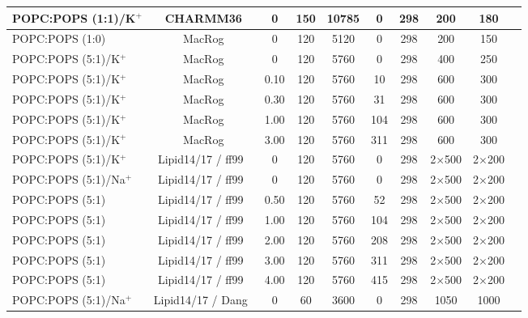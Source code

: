 \documentclass[aps,prl,superscriptaddress,twocolumn]{revtex4}
\begin{document}
\begin{table*}[tb]
\begin{tabular}{lccccccccc}
POPC:POPS (1:1)/K$^{+}$  & CHARMM36 \cite{klauda10,venable13}  & 0  & 150  & 10785  & 0  & 298  & 200  & 180  & \cite{POPC1POPS1noCaClCHARMM} \tabularnewline
\hline 
POPC:POPS (1:0)  & MacRog \cite{maciejewski14}  & 0  & 120 & 5120  & 0  & 298  & 200  & 150  & \cite{macrogPOPC298K} \tabularnewline
POPC:POPS (5:1)/K$^{+}$  & MacRog \cite{maciejewski14}  & 0  & 120 & 5760  & 0  & 298  & 400 & 250 &  \cite{POPCpopsMACROG}\tabularnewline
POPC:POPS (5:1)/K$^{+}$  & MacRog \cite{maciejewski14}  & 0.10  & 120  & 5760  & 10  & 298  & 600  & 300  & \cite{POPCpopsMACROG} \tabularnewline
POPC:POPS (5:1)/K$^{+}$  & MacRog \cite{maciejewski14}  & 0.30  & 120  & 5760  & 31  & 298  & 600  & 300  & \cite{POPCpopsMACROG} \tabularnewline
POPC:POPS (5:1)/K$^{+}$  & MacRog \cite{maciejewski14}  & 1.00  & 120 & 5760  & 104  & 298  & 600  & 300  & \cite{POPCpopsMACROG} \tabularnewline
POPC:POPS (5:1)/K$^{+}$  & MacRog \cite{maciejewski14}  & 3.00  & 120 & 5760  & 311  & 298  & 600 & 300 & \cite{POPCpopsMACROG}\tabularnewline
\hline 
POPC:POPS (5:1)/K$^{+}$  & Lipid14/17 \cite{dickson14,gould18} / ff99~\cite{aqvist90}  & 0  & 120  & 5760  & 0  & 298  & 2$\times$500  & 2$\times$200  & \cite{POPCpopsLIPID17withKCI} \tabularnewline
POPC:POPS (5:1)/Na$^{+}$  & Lipid14/17 \cite{dickson14,gould18} / ff99~\cite{aqvist90}  & 0  & 120 & 5760  & 0  & 298  & 2$\times$500  & 2$\times$200  & \cite{POPCpopsLIPID17withNaCI} \tabularnewline
POPC:POPS (5:1)  & Lipid14/17 \cite{dickson14,gould18} / ff99~\cite{aqvist90}  & 0.50  & 120 & 5760  & 52  & 298  & 2$\times$500  & 2$\times$200  & \cite{POPCpopsLIPID17withCaCl} \tabularnewline
POPC:POPS (5:1)  & Lipid14/17 \cite{dickson14,gould18} / ff99~\cite{aqvist90}  & 1.00  & 120  & 5760  & 104  & 298  & 2$\times$500  & 2$\times$200  & \cite{POPCpopsLIPID17withCaCl} \tabularnewline
POPC:POPS (5:1)  & Lipid14/17 \cite{dickson14,gould18} / ff99~\cite{aqvist90}  & 2.00  & 120  & 5760  & 208  & 298  & 2$\times$500  & 2$\times$200  & \cite{POPCpopsLIPID17withCaCl} \tabularnewline
POPC:POPS (5:1)  & Lipid14/17 \cite{dickson14,gould18} / ff99~\cite{aqvist90}  & 3.00  & 120 & 5760  & 311  & 298  & 2$\times$500  & 2$\times$200  & \cite{POPCpopsLIPID17withCaCl} \tabularnewline
POPC:POPS (5:1)  & Lipid14/17 \cite{dickson14,gould18} / ff99~\cite{aqvist90}  & 4.00  & 120  & 5760  & 415  & 298  & 2$\times$500  & 2$\times$200  & \cite{POPCpopsLIPID17withCaCl} \tabularnewline
POPC:POPS (5:1)/Na$^{+}$  & Lipid14/17 \cite{dickson14,gould18} / Dang~\cite{smith94,dang06}  & 0  & 60 & 3600  & 0  & 298  & 1050  & 1000  & \cite{lipid17_cacl_series} \tabularnewline

\end{tabular}
\end{table*}
\end{document}
